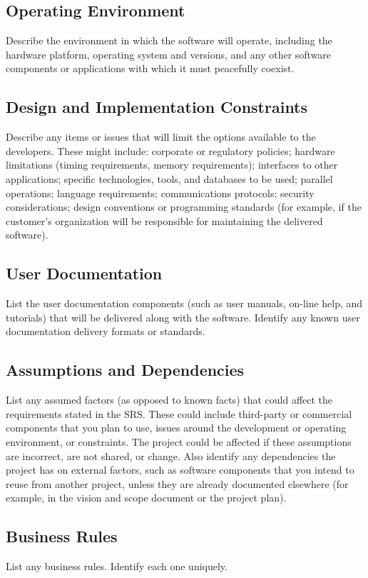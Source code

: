 \documentclass[12pt,oneside,letterpaper]{article}
\begin{document}
\subsection{Operating Environment}
Describe the environment in which the software will operate, including the hardware platform, operating system and versions, and any other software components or applications with which it must peacefully coexist.
\subsection{Design and Implementation Constraints}
Describe any items or issues that will limit the options available to the developers. These might include: corporate or regulatory policies; hardware limitations (timing requirements, memory requirements); interfaces to other applications; specific technologies, tools, and databases to be used; parallel operations; language requirements; communications protocols; security considerations; design conventions or programming standards (for example, if the customer's organization will be responsible for maintaining the delivered software).
\subsection{User Documentation}
List the user documentation components (such as user manuals, on-line help, and tutorials) that will be delivered along with the software. Identify any known user documentation delivery formats or standards.
\subsection{Assumptions and Dependencies}
List any assumed factors (as opposed to known facts) that could affect the requirements stated in the SRS. These could include third-party or commercial components that you plan to use, issues around the development or operating environment, or constraints. The project could be affected if these assumptions are incorrect, are not shared, or change. Also identify any dependencies the project has on external factors, such as software components that you intend to reuse from another project, unless they are already documented elsewhere (for example, in the vision and scope document or the project plan).
\subsection{Business Rules}
List any business rules.  Identify each one uniquely.
\end{document}
